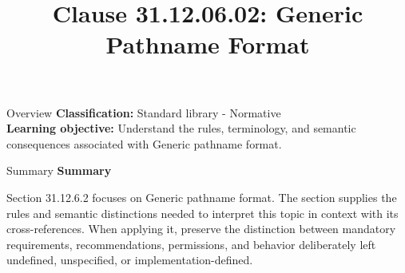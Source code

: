 \documentclass[10pt,letterpaper]{article}
\title{Clause 31.12.06.02: Generic Pathname Format}
\author{}
\date{}
\begin{document}
\maketitle
\begin{CornellOverviewBox}{Overview}
\textbf{Classification:} Standard library - Normative\\[2pt]
\textbf{Learning objective:} Understand the rules, terminology, and semantic consequences associated with Generic pathname format.
\end{CornellOverviewBox}\begin{CornellSummaryBox}{Summary}
{\sffamily\bfseries\color{Accent} Summary}\par\vspace{3pt}Section 31.12.6.2 focuses on Generic pathname format. The section supplies the rules and semantic distinctions needed to interpret this topic in context with its cross-references. When applying it, preserve the distinction between mandatory requirements, recommendations, permissions, and behavior deliberately left undefined, unspecified, or implementation-defined.
\end{CornellSummaryBox}
\end{document}
